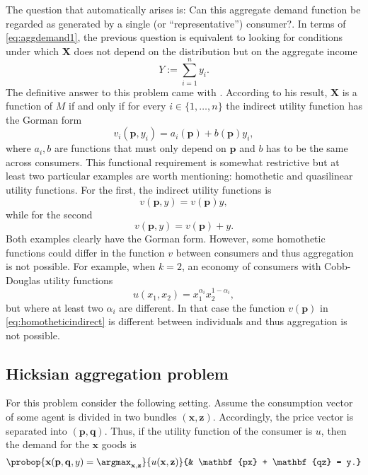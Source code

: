 \documentclass[english, a4paper,12pt]{article}
\begin{document}
The question that automatically arises is: Can this aggregate demand function be regarded as generated by a single (or ``representative'') consumer?. In terms of \cref{eq:aggdemand1}, the previous question is equivalent to looking for conditions under which $\mathbf{X}$ does not depend on the distribution but on the aggregate income
	$$Y := \sum_{i=1}^{n} y_{i}.$$
The definitive answer to this problem came with \cite{Gorman53}. According to his result, $\mathbf{X}$ is a function of $M$ if and only if for every $i \in \{1,\ldots,n\}$ the indirect utility function has the Gorman form
	$$v_{i}(\mathbf{p}, y_{i}) = a_{i}(\mathbf{p}) + b(\mathbf{p})y_{i},$$ 
where $a_{i}, b$ are functions that must only depend on $\mathbf{p}$ and $b$ has to be the same across consumers. This functional requirement is somewhat restrictive but at least two particular examples are worth mentioning: homothetic and quasilinear utility functions. For the first, the indirect utility functions is
	\begin{equation} \label{eq:homotheticindirect}
		v(\mathbf{p}, y) = v(\mathbf{p})y,
	\end{equation}
while for the second
	$$v(\mathbf{p}, y) = v(\mathbf{p}) + y.$$
Both examples clearly have the Gorman form. However, some homothetic functions could differ in the function $v$ between consumers and thus aggregation is not possible. For example, when $k = 2$, an economy of consumers with Cobb-Douglas utility functions
	$$u(x_{1}, x_{2}) = x_{1}^{\alpha_{i}}x_{2}^{1-\alpha_{i}},$$
but where at least two $\alpha_{i}$ are different. In that case the function $v(\mathbf{p})$ in \eqref{eq:homotheticindirect} is different between individuals and thus aggregation is not possible.

\subsection{Hicksian aggregation problem} \label{ssec:repagent}
For this problem consider the following setting. Assume the consumption vector of some agent is divided in two bundles $(\mathbf{x}, \mathbf{z})$. Accordingly, the price vector is separated into $(\mathbf{p}, \mathbf{q})$. Thus, if the utility function of the consumer is $u$, then the demand for the $\mathbf{x}$ goods is
	\begin{equation} \label{eq:hickdisprob}
		\probop{\mathbf{x}(\mathbf{p}, \mathbf{q}, y) = \argmax_{\mathbf{x}, \mathbf{z}}}{u(\mathbf{x}, \mathbf{z})}
					{&	\mathbf{px} + \mathbf{qz} = y.}
	\end{equation}
\end{document}
